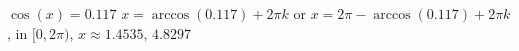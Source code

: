  {$\cos(x) = 0.117$ }
{ $x = \arccos(0.117) + 2\pi k$ or $x = 2\pi - \arccos(0.117) + 2\pi k$, in  $[0, 2\pi)$, $x \approx 1.4535, \, 4.8297$}
